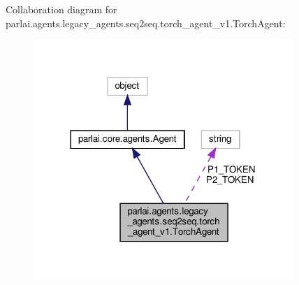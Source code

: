 Collaboration diagram for parlai.\+agents.\+legacy\+\_\+agents.\+seq2seq.\+torch\+\_\+agent\+\_\+v1.\+Torch\+Agent\+:
\nopagebreak
\begin{figure}[H]
\begin{center}
\leavevmode
\includegraphics[width=279pt]{classparlai_1_1agents_1_1legacy__agents_1_1seq2seq_1_1torch__agent__v1_1_1TorchAgent__coll__graph}
\end{center}
\end{figure}
